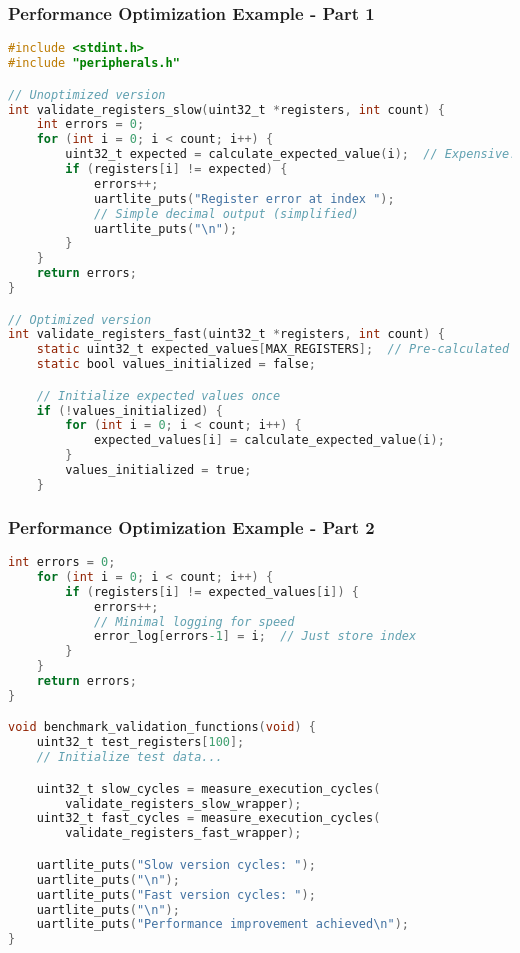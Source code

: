 \documentclass{beamer}
\begin{document}
\begin{frame}[fragile]
\frametitle{Performance Optimization Example - Part 1}
\begin{lstlisting}[language=C, basicstyle=\fontsize{6}{6}\selectfont\ttfamily, backgroundcolor={}]
#include <stdint.h>
#include "peripherals.h"

// Unoptimized version
int validate_registers_slow(uint32_t *registers, int count) {
    int errors = 0;
    for (int i = 0; i < count; i++) {
        uint32_t expected = calculate_expected_value(i);  // Expensive!
        if (registers[i] != expected) {
            errors++;
            uartlite_puts("Register error at index ");
            // Simple decimal output (simplified)
            uartlite_puts("\n");
        }
    }
    return errors;
}

// Optimized version
int validate_registers_fast(uint32_t *registers, int count) {
    static uint32_t expected_values[MAX_REGISTERS];  // Pre-calculated
    static bool values_initialized = false;

    // Initialize expected values once
    if (!values_initialized) {
        for (int i = 0; i < count; i++) {
            expected_values[i] = calculate_expected_value(i);
        }
        values_initialized = true;
    }
\end{lstlisting}
\end{frame}

\begin{frame}[fragile]
\frametitle{Performance Optimization Example - Part 2}
\begin{lstlisting}[language=C, basicstyle=\fontsize{6}{6}\selectfont\ttfamily, backgroundcolor={}]
    int errors = 0;
    for (int i = 0; i < count; i++) {
        if (registers[i] != expected_values[i]) {
            errors++;
            // Minimal logging for speed
            error_log[errors-1] = i;  // Just store index
        }
    }
    return errors;
}

void benchmark_validation_functions(void) {
    uint32_t test_registers[100];
    // Initialize test data...

    uint32_t slow_cycles = measure_execution_cycles(
        validate_registers_slow_wrapper);
    uint32_t fast_cycles = measure_execution_cycles(
        validate_registers_fast_wrapper);

    uartlite_puts("Slow version cycles: ");
    uartlite_puts("\n");
    uartlite_puts("Fast version cycles: ");
    uartlite_puts("\n");
    uartlite_puts("Performance improvement achieved\n");
}
\end{lstlisting}
\end{frame}
\end{document}
